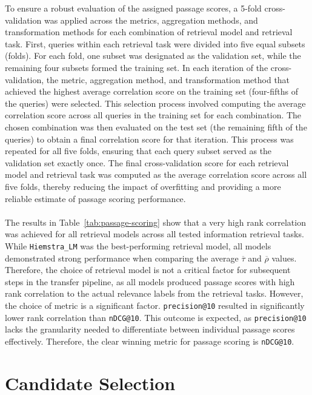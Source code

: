 To ensure a robust evaluation of the assigned passage scores, a 5-fold cross-validation was applied across the metrics, aggregation methods, and transformation methods for each combination of retrieval model and retrieval task. First, queries within each retrieval task were divided into five equal subsets (folds). For each fold, one subset was designated as the validation set, while the remaining four subsets formed the training set. In each iteration of the cross-validation, the metric, aggregation method, and transformation method that achieved the highest average correlation score on the training set (four-fifths of the queries) were selected. This selection process involved computing the average correlation score across all queries in the training set for each combination. The chosen combination was then evaluated on the test set (the remaining fifth of the queries) to obtain a final correlation score for that iteration. This process was repeated for all five folds, ensuring that each query subset served as the validation set exactly once. The final cross-validation score for each retrieval model and retrieval task was computed as the average correlation score across all five folds, thereby reducing the impact of overfitting and providing a more reliable estimate of passage scoring performance.
\\\\
The results in Table~\ref{tab:passage-scoring} show that a very high rank correlation was achieved for all retrieval models across all tested information retrieval tasks. While \texttt{Hiemstra\_LM} was the best-performing retrieval model, all models demonstrated strong performance when comparing the average $\overline{\tau}$ and $\overline{\rho}$ values. Therefore, the choice of retrieval model is not a critical factor for subsequent steps in the transfer pipeline, as all models produced passage scores with high rank correlation to the actual relevance labels from the retrieval tasks. However, the choice of metric is a significant factor. \texttt{precision@10} resulted in significantly lower rank correlation than \texttt{nDCG@10}. This outcome is expected, as \texttt{precision@10} lacks the granularity needed to differentiate between individual passage scores effectively. Therefore, the clear winning metric for passage scoring is \texttt{nDCG@10}.
\pagebreak


\section{Candidate Selection}\label{eval-candidate-selection}

